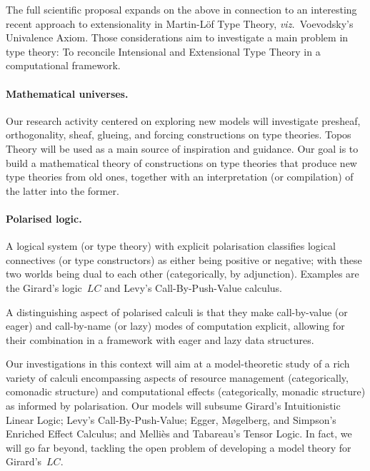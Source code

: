 \documentclass[11pt,twocolumn]{article}
\newcommand{\hl}[1]{#1}%
\newcommand{\viz}{\emph{viz.}}
\newcommand{\LC}{\mbox{$LC$}}
\begin{document}
The full scientific proposal expands on the above in connection to an
interesting recent approach to extensionality in Martin-L\"of Type Theory,
\viz~Voevodsky's Univalence Axiom. %
Those considerations \hl{aim} to investigate a main problem in type
theory: To reconcile Intensional and Extensional Type Theory in a
computational framework.

\paragraph{Mathematical universes.}
\label{MethodologyMathematicalUniversesParagraph}

Our \hl{research} activity centered on exploring new models will investigate
pre\-sheaf, orthogonality, sheaf, glueing, and forcing constructions on type
theories.  Topos Theory %
will be used as a main source of inspiration and guidance.  Our \hl{goal}
is to build a mathematical theory of constructions on type theories that
produce new type theories from old ones, together with an interpretation
(or compilation) of the latter into the former.

\paragraph{Polarised logic.}
\label{PolarisationParagraph}

A logical system (or type theory) with explicit polarisation classifies
logical connectives (or type constructors) as either being positive or
negative; with these two worlds being dual to each other (categorically, by
adjunction).  Examples are the Girard's logic~{\LC} %
and Levy's Call-By-Push-Value calculus. %

A distinguishing aspect of polarised calculi is that they make call-by-value
(or eager) and call-by-name (or lazy) modes of computation explicit, allowing
for their combination in a framework with eager and lazy data structures.

Our investigations in this context will aim at a model-theoretic study of
a rich variety of calculi encompassing aspects of resource management
(categorically, comonadic structure) %
and computational effects (categorically, monadic 
structure) %
as informed by polarisation.
%
Our models will subsume 
%
Girard's Intuitionistic Linear Logic; %
%
Levy's Call-By-Push-Value; %
%
Egger, M{\o}gelberg, and Simpson's Enriched Effect Calculus; %
and
%
Melli\`es and Tabareau's Tensor Logic. %
%
In fact, we will go far beyond, tackling the open \hl{problem} of developing a
model theory for Girard's~\LC.
\end{document}
